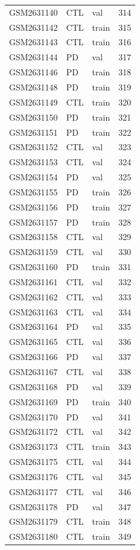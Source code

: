 \begin{footnotesize}
\begin{longtable}{llll}
GSM2631140 & CTL & val & 314 \\
GSM2631142 & CTL & train & 315 \\
GSM2631143 & CTL & train & 316 \\
GSM2631144 & PD & val & 317 \\
GSM2631146 & PD & train & 318 \\
GSM2631148 & PD & train & 319 \\
GSM2631149 & CTL & train & 320 \\
GSM2631150 & PD & train & 321 \\
GSM2631151 & PD & train & 322 \\
GSM2631152 & CTL & val & 323 \\
GSM2631153 & CTL & val & 324 \\
GSM2631154 & PD & val & 325 \\
GSM2631155 & PD & train & 326 \\
GSM2631156 & PD & train & 327 \\
GSM2631157 & PD & train & 328 \\
GSM2631158 & CTL & val & 329 \\
GSM2631159 & CTL & val & 330 \\
GSM2631160 & PD & train & 331 \\
GSM2631161 & CTL & val & 332 \\
GSM2631162 & CTL & val & 333 \\
GSM2631163 & CTL & val & 334 \\
GSM2631164 & PD & val & 335 \\
GSM2631165 & CTL & val & 336 \\
GSM2631166 & PD & val & 337 \\
GSM2631167 & CTL & val & 338 \\
GSM2631168 & PD & val & 339 \\
GSM2631169 & PD & train & 340 \\
GSM2631170 & PD & val & 341 \\
GSM2631172 & CTL & val & 342 \\
GSM2631173 & CTL & train & 343 \\
GSM2631175 & CTL & val & 344 \\
GSM2631176 & CTL & val & 345 \\
GSM2631177 & CTL & val & 346 \\
GSM2631178 & PD & val & 347 \\
GSM2631179 & CTL & train & 348 \\
GSM2631180 & CTL & train & 349 \\

\end{longtable}
\end{footnotesize}
